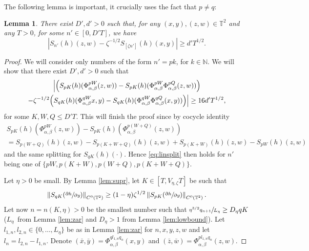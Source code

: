 \documentclass[JEP,XML,SOM,Unicode,NoEqCountersInSection]{cedram}
\theoremstyle{definition}
\theoremstyle{plain}
\newtheorem{lemma}[definition]{Lemma}
\newcommand\NN{\mathbb{N}}
\newcommand\TT{\mathbb{T}}
\begin{document}
The following lemma is important, it crucially uses the fact that $p\neq q$:
\begin{lemma}\label{lem:linsplit} There exist $D',d'>0$
such that, for any $(x,y), (z,w)\in \TT^2$ and any $T>0$, for some $n'\in [0,D'T]$, we have
\begin{equation}\label{eq:linsplit}
|S_{n'}(h)(z,w)-\zeta^{-1/2}S_{[\zeta n']}(h)(x,y)|\geq d'T^{1/2}.
\end{equation}
\end{lemma}
\begin{proof} We will consider only numbers of the form $n'=pk$, for $k\in \NN$. We will show that there exist $D',d'>0$ such that
\begin{multline}\label{mu:show}
\Bigl| \Bigl(S_{pK}(h)(\Phi_{\alpha,\beta}^{pW}(z,w))-S_{pK}(h)(\Phi_{\alpha,\beta}^{pW}\Phi_{\alpha,\beta}^{pQ}(z,w)) \Bigr)\\
-\zeta^{-1/2}
\Bigl(S_{qK}(h)(\Phi_{\alpha,\beta}^{qW}x,y)-S_{qK}(h)(\Phi_{\alpha,\beta}^{qW}\Phi_{\alpha,\beta}^{qQ}(x,y)) \Bigr)
\Bigr|\geq 16d'T^{1/2},
\end{multline}
for some $K,W,Q\leq D' T$. This will finish the proof since by cocycle identity\vspace*{-5pt}
\begin{multline*}
S_{pK}(h)(\Phi_{\alpha,\beta}^{pW}(z,w))-S_{pK}(h)(\Phi_{\alpha,\beta}^{p(W+Q)}(z,w))\\
=S_{p(W+Q)}(h)(z,w)-S_{p(K+W+Q)}(h)(z,w)+S_{p(K+W)}(h)(z,w)-
S_{pW}(h)(z,w)
\end{multline*}
and the same splitting for $S_{qK}(h)(\cdot)$. Hence \eqref{eq:linsplit} then holds for $n'$ being one of $\{pW,p(K+W),p(W+Q),p(K+W+Q)\}$.

Let $\eta>0$ be small. By Lemma \ref{lem:supr}, let $K\in [T,V_{\eta,\zeta}T]$ be such that
\begin{equation}\label{eq2}
\left\|S_{qK}(\sfrac{\partial h}{\partial y})\right\|_{C^0(\TT^2)}\geq (1-\eta)\zeta^{1/2}\left\|S_{pK}(\sfrac{\partial h}{\partial y})\right\|_{C^0(\TT^2)}.
\end{equation}
Let now $n=n(K,\eta)>0$ be the smallest number such that
$\sfrac{\eta^{3/2}q_{n+1}}{L_\eta}\geq D_\eta qK$ ($L_\eta$~from Lemma \ref{lem:zar} and $D_\eta>1$ from Lemma \ref{lem:lowbound}). Let $l_{1,n},l_{2,n}\in \{0,\ldots,L_\eta\}$ be as in Lemma \ref{lem:zar} for $n,x,y,z,w$ and let $l_n=l_{2,n}-l_{1,n}$. Denote $(\bar{x},\bar{y})=\Phi_{\alpha,\beta}^{ql_{1,n}q_n}(x,y)$ and
$(\bar{z},\bar{w})=\Phi_{\alpha,\beta}^{pl_{1,n}q_n}(z,w)$.


\end{proof}
\end{document}

